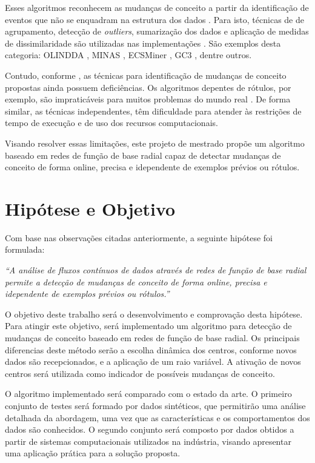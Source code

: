 \documentclass[qual, classic, a4paper]{ufbathesis}
\begin{document}
Esses algoritmos reconhecem as mudanças de conceito a partir da identificação de eventos que não se enquadram na estrutura dos dados \cite{Spinosa:2007:OCA:1244002.1244107}.
Para isto, técnicas de de agrupamento, detecção de \textit{outliers}, sumarização dos dados e aplicação de medidas de dissimilaridade são utilizadas nas implementações \cite{Ryu:Kantardzic:2012}.
São exemplos desta categoria:
OLINDDA \cite{Spinosa:2007:OCA:1244002.1244107},
MINAS \cite{Faria:2013:NDA:2480362.2480515},
ECSMiner \cite{Masud:2011:CNC:1978259.1978529},
GC3 \cite{Sethi2016b:GC3}, dentre outros.

Contudo, conforme \cite{Aggarwal:2006:DSM:1196418}, as técnicas para identificação de mudanças de conceito propostas ainda possuem deficiências.
Os algoritmos depentes de rótulos, por exemplo, são impraticáveis para muitos problemas do mundo real \cite{Gama:2014:SCD:2597757.2523813}.
De forma similar, as técnicas independentes, têm dificuldade para atender às restrições de tempo de execução e de uso dos recursos computacionais.

Visando resolver essas limitações, este projeto de mestrado propõe um algoritmo baseado em redes de função de base radial capaz de detectar mudanças de conceito de forma online, precisa e idependente de exemplos prévios ou rótulos.

\section{Hipótese e Objetivo}

Com base nas observações citadas anteriormente, a seguinte hipótese foi formulada:

\begin{center}
\textit{``A análise de fluxos contínuos de dados através de redes de função de base radial permite a detecção de mudanças de conceito de forma online, precisa e idependente de exemplos prévios ou rótulos.''}
\end{center}

O objetivo deste trabalho será o desenvolvimento e comprovação desta hipótese.
Para atingir este objetivo, será implementado um algoritmo para detecção de mudanças de conceito baseado em redes de função de base radial. 
Os principais diferencias deste método serão a escolha dinâmica dos centros, conforme novos dados são recepcionados, e a aplicação de um raio variável.
A ativação de novos centros será utilizada como indicador de possíveis mudanças de conceito.

O algoritmo implementado será comparado com o estado da arte. 
O primeiro conjunto de testes será formado por dados sintéticos, que permitirão uma análise detalhada da abordagem, uma vez que as características e os comportamentos dos dados são conhecidos. 
O segundo conjunto será composto por dados obtidos a partir de sistemas computacionais utilizados na indústria,
visando apresentar uma aplicação prática para a solução proposta. 
\end{document}

